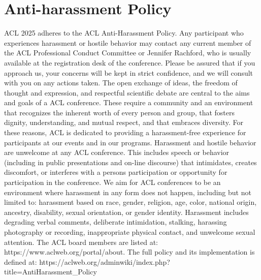 \chapter{Anti-harassment Policy}
\vspace*{0.2cm}

ACL 2025 adheres to the ACL Anti-Harassment Policy. Any participant who experiences harassment or hostile behavior may contact any current member of the ACL Professional Conduct Committee or Jennifer Rachford, who is usually available at the registration desk of the conference. Please be assured that if you approach us, your concerns will be kept in strict confidence, and we will consult with you on any actions taken. The open exchange of ideas, the freedom of thought and expression, and respectful scientific debate are central to the aims and goals of a ACL conference. These require a community and an environment that recognizes the inherent worth of every person and group, that fosters dignity, understanding, and mutual respect, and that embraces diversity. For these reasons, ACL is dedicated to providing a harassment-free experience for participants at our events and in our programs. 
Harassment and hostile behavior are unwelcome at any ACL conference. This includes speech or behavior (including in public presentations and on-line discourse) that intimidates, creates discomfort, or interferes with a persons participation or opportunity for participation in the conference. We aim for ACL conferences to be an environment where harassment in any form does not happen, including but not limited to: harassment based on race, gender, religion, age, color, national origin, ancestry, disability, sexual orientation, or gender identity. 
Harassment includes degrading verbal comments, deliberate intimidation, stalking, harassing photography or recording, inappropriate physical contact, and unwelcome sexual attention. 
The ACL board members are listed at: 
https://www.aclweb.org/portal/about. 
The full policy and its implementation is defined at: 
https://aclweb.org/adminwiki/index.php?title=Anti\-Harassment\_Policy
